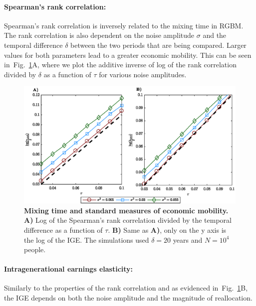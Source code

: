 \documentclass[11pt]{article}
\newcommand{\fref}[1]{Fig.~\ref{fig:#1}}
\numberwithin{equation}{section}
\begin{document}
\paragraph{Spearman's rank correlation:} Spearman's rank correlation is inversely related to the mixing time in RGBM. The rank correlation is also dependent on the noise amplitude $\sigma$ and the temporal difference $\delta$ between the two periods that are being compared. Larger values for both parameters lead to a greater economic mobility. This can be seen in~\fref{rgbm-standard-measures}A, where we plot the additive inverse of log of the rank correlation divided by $\delta$ as a function of $\tau$ for various noise amplitudes.

\begin{figure}[!htb]
\centering
\includegraphics[width=1.0\textwidth]{figs/fig_rgbm_standard_measures.eps}
\caption{\textbf{Mixing time and standard measures of economic mobility.} \textbf{A)} Log of the Spearman's rank correlation divided by the temporal difference as a function of $\tau$. \textbf{B)} Same as \textbf{A)}, only on the y axis is the log of the IGE. The simulations used $\delta = 20$ years and $N = 10^4$ people.
\label{fig:rgbm-standard-measures}}
\end{figure}

\paragraph{Intragenerational earnings elasticity:} Similarly to the properties of the rank correlation and as evidenced in~\fref{rgbm-standard-measures}B, the IGE depends on both the noise amplitude and the magnitude of reallocation.
\end{document}

